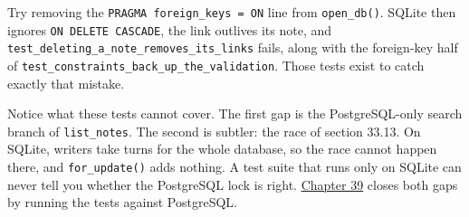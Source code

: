 \noindent{}Try removing the \texttt{PRAGMA\ foreign\_}\allowbreak{}\texttt{keys\ =}\allowbreak{}\texttt{\ ON} line from \texttt{open\_db()}. SQLite then ignores \texttt{ON\ DELETE\ CASCADE}, the link outlives its note, and \texttt{test\_}\allowbreak{}\texttt{deleting\_}\allowbreak{}\texttt{a\_}\allowbreak{}\texttt{note\_}\allowbreak{}\texttt{removes\_}\allowbreak{}\texttt{its\_}\allowbreak{}\texttt{links} fails, along with the foreign-key half of \texttt{test\_}\allowbreak{}\texttt{constraints\_}\allowbreak{}\texttt{back\_}\allowbreak{}\texttt{up\_}\allowbreak{}\texttt{the\_}\allowbreak{}\texttt{validation}. Those tests exist to catch exactly that mistake.

Notice what these tests cannot cover. The first gap is the PostgreSQL-only search branch of \texttt{list\_notes}. The second is subtler: the race of section 33.13. On SQLite, writers take turns for the whole database, so the race cannot happen there, and \texttt{for\_update()} adds nothing. A test suite that runs only on SQLite can never tell you whether the PostgreSQL lock is right. \hyperref[ch:39-local-vs-production]{Chapter 39} closes both gaps by running the tests against PostgreSQL.

